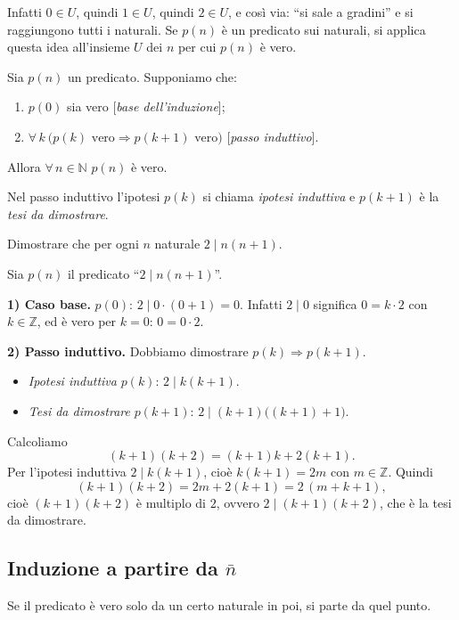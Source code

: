\documentclass[11pt,a4paper]{article}
\begin{document}
Infatti $0 \in U$, quindi $1 \in U$, quindi $2 \in U$, e così via: ``si sale
a gradini'' e si raggiungono tutti i naturali. Se $p(n)$ è un predicato
sui naturali, si applica questa idea all'insieme $U$ dei $n$ per cui
$p(n)$ è vero.

\begin{teorema}
Sia $p(n)$ un predicato. Supponiamo che:
\begin{enumerate}
    \item $p(0)$ sia vero \hfill [\emph{base dell'induzione}];
    \item $\forall\, k \ \big(p(k) \text{ vero} \Rightarrow p(k+1)
          \text{ vero}\big)$ \hfill [\emph{passo induttivo}].
\end{enumerate}
Allora $\forall\, n \in \mathbb{N}$ $p(n)$ è vero.
\end{teorema}

Nel passo induttivo l'ipotesi $p(k)$ si chiama \emph{ipotesi induttiva} e
$p(k+1)$ è la \emph{tesi da dimostrare}.

\begin{esempio}
Dimostrare che per ogni $n$ naturale $2 \mid n(n+1)$.

Sia $p(n)$ il predicato ``$2 \mid n(n+1)$''.

\textbf{1) Caso base.} $p(0)$: $2 \mid 0 \cdot (0 + 1) = 0$. Infatti
$2 \mid 0$ significa $0 = k \cdot 2$ con $k \in \mathbb{Z}$, ed è vero per
$k = 0$: $0 = 0 \cdot 2$.

\textbf{2) Passo induttivo.} Dobbiamo dimostrare $p(k) \Rightarrow
p(k+1)$.
\begin{itemize}
    \item \emph{Ipotesi induttiva} $p(k)$: $2 \mid k(k+1)$.
    \item \emph{Tesi da dimostrare} $p(k+1)$: $2 \mid (k+1)\big((k+1)+1\big)$.
\end{itemize}
Calcoliamo
\[
(k+1)(k+2) = (k+1)k + 2(k+1).
\]
Per l'ipotesi induttiva $2 \mid k(k+1)$, cioè $k(k+1) = 2m$ con
$m \in \mathbb{Z}$. Quindi
\[
(k+1)(k+2) = 2m + 2(k+1) = 2\,(m + k + 1),
\]
cioè $(k+1)(k+2)$ è multiplo di $2$, ovvero $2 \mid (k+1)(k+2)$, che è la
tesi da dimostrare.
\end{esempio}

\subsection{Induzione a partire da $\bar n$}

Se il predicato è vero solo da un certo naturale in poi, si parte da
quel punto.
\end{document}
